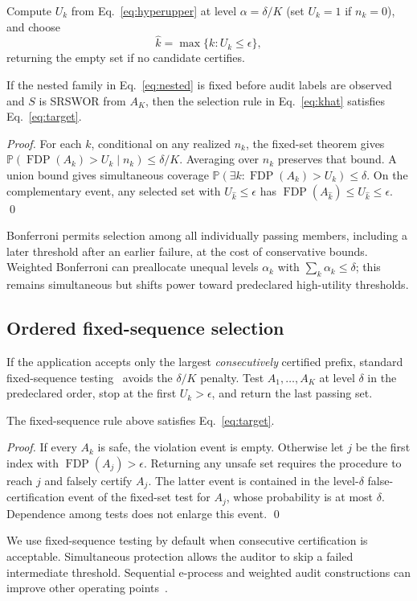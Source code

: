 \documentclass[runningheads]{llncs}
\newcommand{\FDP}{\operatorname{FDP}}
\newcommand{\Prb}{\mathbb{P}}
\begin{document}
Compute $U_k$ from Eq.~\eqref{eq:hyperupper} at level $\alpha=\delta/K$ (set $U_k=1$ if $n_k=0$), and choose
\begin{equation}
\widehat{k}=\max\{k: U_k\le\epsilon\},
\label{eq:khat}
\end{equation}
returning the empty set if no candidate certifies.

\begin{theorem}
If the nested family in Eq.~\eqref{eq:nested} is fixed before audit labels are observed and $S$ is SRSWOR from $A_K$, then the selection rule in Eq.~\eqref{eq:khat} satisfies Eq.~\eqref{eq:target}.
\end{theorem}
\begin{proof}
For each $k$, conditional on any realized $n_k$, the fixed-set theorem gives $\Prb(\FDP(A_k)>U_k\mid n_k)\le\delta/K$. Averaging over $n_k$ preserves that bound. A union bound gives simultaneous coverage $\Prb(\exists k:\FDP(A_k)>U_k)\le\delta$. On the complementary event, any selected set with $U_{\widehat{k}}\le\epsilon$ has $\FDP(A_{\widehat{k}})\le U_{\widehat{k}}\le\epsilon$. \qed
\end{proof}

Bonferroni permits selection among all individually passing members, including a later threshold after an earlier failure, at the cost of conservative bounds. Weighted Bonferroni can preallocate unequal levels $\alpha_k$ with $\sum_k\alpha_k\le\delta$; this remains simultaneous but shifts power toward predeclared high-utility thresholds.

\subsection{Ordered fixed-sequence selection}
If the application accepts only the largest \emph{consecutively} certified prefix, standard fixed-sequence testing~\cite{ltt2025} avoids the $\delta/K$ penalty. Test $A_1,\ldots,A_K$ at level $\delta$ in the predeclared order, stop at the first $U_k>\epsilon$, and return the last passing set.

\begin{theorem}
The fixed-sequence rule above satisfies Eq.~\eqref{eq:target}.
\end{theorem}
\begin{proof}
If every $A_k$ is safe, the violation event is empty. Otherwise let $j$ be the first index with $\FDP(A_j)>\epsilon$. Returning any unsafe set requires the procedure to reach $j$ and falsely certify $A_j$. The latter event is contained in the level-$\delta$ false-certification event of the fixed-set test for $A_j$, whose probability is at most $\delta$. Dependence among tests does not enlarge this event. \qed
\end{proof}
We use fixed-sequence testing by default when consecutive certification is acceptable. Simultaneous protection allows the auditor to skip a failed intermediate threshold. Sequential e-process and weighted audit constructions can improve other operating points~\cite{alpha2023,rlfa2023}.
\end{document}
